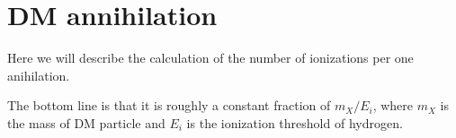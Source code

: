 \section{DM annihilation}

Here we will describe the calculation of the number of ionizations per one anihilation.

The bottom line is that it is roughly a constant fraction of $m_X/E_i$, where $m_X$ is the mass of DM particle and $E_i$ is the ionization threshold of hydrogen.
